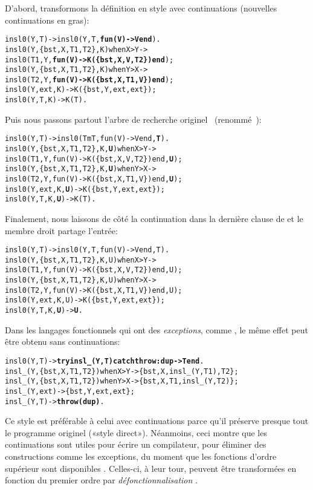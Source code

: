 D'abord, transformons la définition en style avec continuations
(nouvelles continuations en gras):
\begin{alltt}
insl0(Y,T)               -> insl0(Y,T,\textbf{fun(V) -> V end}).
insl0(Y,\{bst,X,T1,T2\},K) when X > Y ->
\hfill{}insl0(T1,Y,\textbf{fun(V) -> K(\{bst,X,V,T2\}) end});
insl0(Y,\{bst,X,T1,T2\},K) when Y > X ->
\hfill{}insl0(T2,Y,\textbf{fun(V) -> K(\{bst,X,T1,V\}) end});
insl0(Y,          ext,K) -> K(\{bst,Y,ext,ext\});
insl0(Y,            T,K) -> K(T).
\end{alltt}
Puis nous passons partout l'arbre de recherche originel~
(renommé~):
\begin{alltt}
insl0(Y,T)                 -> insl0(TmT,fun(V) -> V end,\textbf{T}).
insl0(Y,\{bst,X,T1,T2\},K,\textbf{U}) when X > Y ->
\hfill{}insl0(T1,Y,fun(V) -> K(\{bst,X,V,T2\}) end,\textbf{U});
insl0(Y,\{bst,X,T1,T2\},K,\textbf{U}) when Y > X ->
\hfill{}insl0(T2,Y,fun(V) -> K(\{bst,X,T1,V\}) end,\textbf{U});
insl0(Y,          ext,K,\textbf{U}) -> K(\{bst,Y,ext,ext\});
insl0(Y,            T,K,\textbf{U}) -> K(T).
\end{alltt}
Finalement, nous laissons de côté la continuation dans la dernière
clause de  et le membre droit partage l'entrée:
\begin{alltt}
insl0(Y,T)                 -> insl0(Y,T,fun(V) -> V end,T).
insl0(Y,\{bst,X,T1,T2\},K,U) when X > Y ->
\hfill{}insl0(T1,Y,fun(V) -> K(\{bst,X,V,T2\}) end,U);
insl0(Y,\{bst,X,T1,T2\},K,U) when Y > X ->
\hfill{}insl0(T2,Y,fun(V) -> K(\{bst,X,T1,V\}) end,U);
insl0(Y,          ext,K,U) -> K(\{bst,Y,ext,ext\});
insl0(Y,            T,K,\textbf{U}) -> \textbf{U}.\hfill% \emph{Entrée partagée}
\end{alltt}
Dans les langages fonctionnels qui ont des
\emph{exceptions},
comme \Erlang, le même effet peut être obtenu sans continuations:
\begin{alltt}
insl0(Y,T)\hfill{}-> \textbf{try insl\_(Y,T) catch throw:dup -> T end}.
insl\_(Y,\{bst,X,T1,T2\}) when X > Y -> \{bst,X,insl\_(Y,T1),T2\};
insl\_(Y,\{bst,X,T1,T2\}) when Y > X -> \{bst,X,T1,insl\_(Y,T2)\};
insl\_(Y,          ext)            -> \{bst,Y,ext,ext\};
insl\_(Y,            T)            -> \textbf{throw(dup)}.
\end{alltt}
Ce style est préférable à celui avec continuations parce qu'il
préserve presque tout le programme originel («style
direct»). Néanmoins, ceci montre que les continuations sont utiles
pour écrire un compilateur, pour éliminer des constructions comme les
exceptions, du moment que les fonctions d'ordre supérieur sont
disponibles \citep{Appel_1992}. Celles-ci, à leur tour, peuvent être
transformées en fonction du premier ordre par
\emph{défonctionnalisation}
\citep{Reynolds_1972,DanvyNielsen_2001}.

